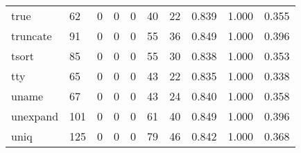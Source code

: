 \begin{longtable}{lp{2.0cm}p{2.0cm}p{2.0cm}p{2.0cm}p{2.0cm}p{2.0cm}p{2.0cm}p{2.0cm}p{2.0cm}}
true      &                     62 &                                             0 &                                            0 &                                           0 &                                           40 &                                         22 &                                0.839 &                                  1.000 &                                0.355 \\
truncate  &                     91 &                                             0 &                                            0 &                                           0 &                                           55 &                                         36 &                                0.849 &                                  1.000 &                                0.396 \\
tsort     &                     85 &                                             0 &                                            0 &                                           0 &                                           55 &                                         30 &                                0.838 &                                  1.000 &                                0.353 \\
tty       &                     65 &                                             0 &                                            0 &                                           0 &                                           43 &                                         22 &                                0.835 &                                  1.000 &                                0.338 \\
uname     &                     67 &                                             0 &                                            0 &                                           0 &                                           43 &                                         24 &                                0.840 &                                  1.000 &                                0.358 \\
unexpand  &                    101 &                                             0 &                                            0 &                                           0 &                                           61 &                                         40 &                                0.849 &                                  1.000 &                                0.396 \\
uniq      &                    125 &                                             0 &                                            0 &                                           0 &                                           79 &                                         46 &                                0.842 &                                  1.000 &                                0.368 \\

\end{longtable}
